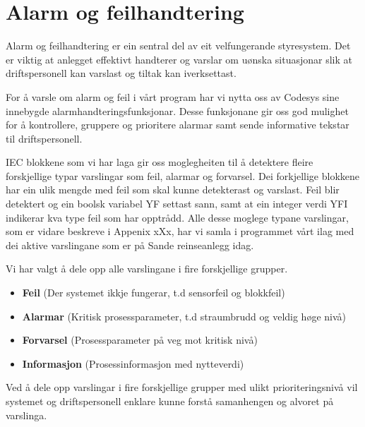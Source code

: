 \newpage
\section{Alarm og feilhandtering}
\thispagestyle{fancy}

Alarm og feilhandtering er ein sentral del av eit velfungerande styresystem. Det er viktig
at anlegget effektivt handterer og varslar om uønska situasjonar slik at 
driftspersonell kan varslast og tiltak kan iverksettast.

For å varsle om alarm og feil i vårt program har vi nytta oss av \gls{Codesys} sine
innebygde alarmhandteringsfunksjonar. Desse funksjonane gir oss god mulighet for å 
kontrollere, gruppere og prioritere alarmar samt sende informative tekstar til driftspersonell.

IEC blokkene som vi har laga gir oss moglegheiten til å detektere fleire forskjellige typar varslingar
som feil, alarmar og forvarsel.
Dei forkjellige blokkene har ein ulik mengde med feil som skal kunne detekterast og varslast.
Feil blir detektert og ein boolsk variabel YF settast sann, 
samt at ein integer verdi YFI indikerar kva type feil som har opptrådd. \newline
Alle desse moglege typane varslingar, som er vidare beskreve i Appenix xXx, 
har vi samla i programmet vårt ilag 
med dei aktive varslingane som er på Sande reinseanlegg idag.

Vi har valgt å dele opp alle varslingane i fire forskjellige grupper.

\begin{itemize}
    \item \textbf{Feil}          (Der systemet ikkje fungerar, t.d sensorfeil og blokkfeil)
    \item \textbf{Alarmar}       (Kritisk prosessparameter, t.d straumbrudd og veldig høge nivå)
    \item \textbf{Forvarsel}     (Prosessparameter på veg mot kritisk nivå)
    \item \textbf{Informasjon}   (Prosessinformasjon med nytteverdi)
\end{itemize}

Ved å dele opp varslingar i fire forskjellige grupper med ulikt prioriteringsnivå vil systemet
og driftspersonell enklare kunne forstå samanhengen og alvoret på varslinga.


\newpage